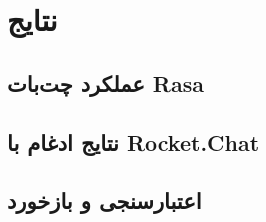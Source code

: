 \chapter{نتایج}

\section{عملکرد چت‌بات Rasa}

\section{نتایج ادغام با Rocket.Chat}

\section{اعتبارسنجی و بازخورد}


\newpage